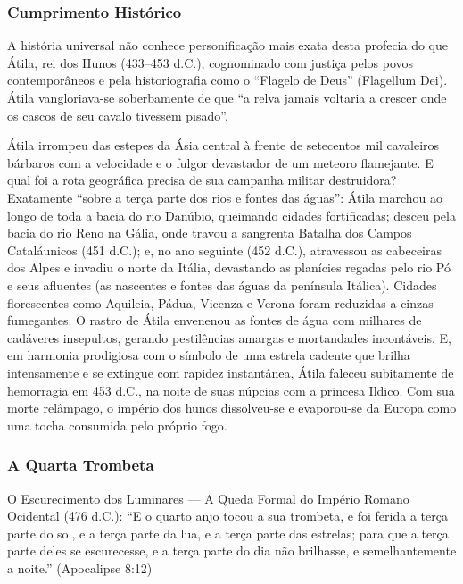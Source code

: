 \documentclass[11pt,a4paper,openany]{book}
\begin{document}
\subsubsection*{Cumprimento Histórico}
A história universal não conhece personificação mais exata desta profecia do que Átila, rei dos Hunos (433–453 d.C.), cognominado com justiça pelos povos contemporâneos e pela historiografia como o ``Flagelo de Deus'' (Flagellum Dei). Átila vangloriava-se soberbamente de que ``a relva jamais voltaria a crescer onde os cascos de seu cavalo tivessem pisado''.

Átila irrompeu das estepes da Ásia central à frente de setecentos mil cavaleiros bárbaros com a velocidade e o fulgor devastador de um meteoro flamejante. E qual foi a rota geográfica precisa de sua campanha militar destruidora? Exatamente ``sobre a terça parte dos rios e fontes das águas'':
Átila marchou ao longo de toda a bacia do rio Danúbio, queimando cidades fortificadas; desceu pela bacia do rio Reno na Gália, onde travou a sangrenta Batalha dos Campos Cataláunicos (451 d.C.); e, no ano seguinte (452 d.C.), atravessou as cabeceiras dos Alpes e invadiu o norte da Itália, devastando as planícies regadas pelo rio Pó e seus afluentes (as nascentes e fontes das águas da península Itálica). Cidades florescentes como Aquileia, Pádua, Vicenza e Verona foram reduzidas a cinzas fumegantes. O rastro de Átila envenenou as fontes de água com milhares de cadáveres insepultos, gerando pestilências amargas e mortandades incontáveis.
E, em harmonia prodigiosa com o símbolo de uma estrela cadente que brilha intensamente e se extingue com rapidez instantânea, Átila faleceu subitamente de hemorragia em 453 d.C., na noite de suas núpcias com a princesa Ildico. Com sua morte relâmpago, o império dos hunos dissolveu-se e evaporou-se da Europa como uma tocha consumida pelo próprio fogo.


\subsubsection*{A Quarta Trombeta}
O Escurecimento dos Luminares — A Queda Formal do Império Romano Ocidental (476 d.C.):
``E o quarto anjo tocou a sua trombeta, e foi ferida a terça parte do sol, e a terça parte da lua, e a terça parte das estrelas; para que a terça parte deles se escurecesse, e a terça parte do dia não brilhasse, e semelhantemente a noite.'' (Apocalipse 8:12)
\end{document}
